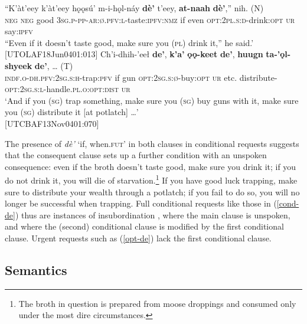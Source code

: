 \documentclass[output=paper,colorlinks,citecolor=brown
]{langscibook}
\begin{document}
\begin{exe}
\ex \label{cond-de}
\begin{xlista}
\ex \label{cond-dea}
\gll ``K'àt'eey k'àt'eey hǫǫsú' m-i-hǫl-náy \textbf{dè'} t'eey, \textbf{at-naah} \textbf{dè'},'' nih. \textnormal{(N)} \\
\textsc{neg} \textsc{neg} good \textsc{3sg.p-pp-ar:ø.pfv:l}-taste:\textsc{ipfv:nmz} if even \textsc{opt:2pl.s:d}-drink:\textsc{opt} \textsc{ur} say:\textsc{ipfv} \\
``Even if it doesn't taste good, make sure you (\textsc{pl}) drink it,'' he said.' \\ \hfill [UTOLAF18Jun0401:013]
\ex\label{cond-deb}
\gll Ch'i-dhih-'eeł \textbf{de'}, \textbf{k'a'} \textbf{ǫǫ-keet} \textbf{de'}, \textbf{huugn} \textbf{ta-'ǫl-shyeek} \textbf{de'},  {\ldots} \textnormal{(T)} \\
\textsc{indf.o-dh.pfv:2sg.s:h}-trap:\textsc{pfv} if gun \textsc{opt:2sg.s:ø}-buy:\textsc{opt} \textsc{ur} etc. distribute-\textsc{opt:2sg.s:l}-handle.\textsc{pl.o:opt:dist} \textsc{ur} \\
\glt `And if you (\textsc{sg}) trap something, make sure you (\textsc{sg}) buy guns with it, make sure you (\textsc{sg}) distribute it [at potlatch] \ldots' \\ \hfill [UTCBAF13Nov0401:070]
\end{xlista}
\end{exe}

\noindent The presence of \textit{dè'} `if, when.\textsc{fut}' in both clauses in conditional requests suggests that the consequent clause sets up a further condition with an unspoken consequence: even if the broth doesn't taste good, make sure you drink it; if you do not drink it, you will  die of starvation.\footnote{The broth in question is prepared from moose droppings and consumed only under the most dire circumstances.} If you have good luck trapping, make sure to distribute your wealth through a potlatch; if you fail to do so, you will no longer be successful when trapping. Full conditional requests like those in (\ref{cond-de}) thus are instances of insubordination \citep{evans2007}, where the main clause is unspoken, and where the (second) conditional clause is modified by the first conditional clause. Urgent requests such as (\ref{opt-de}) lack the first conditional clause. 

\subsection{Semantics}
\largerpage
\label{subsection:urgent-semantics}
\end{document}
